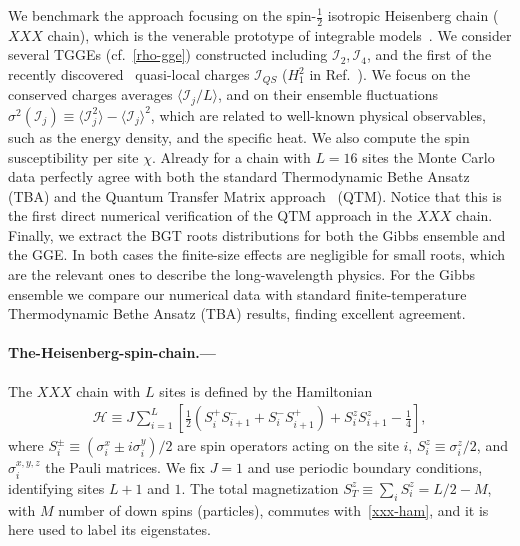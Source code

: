 \documentclass[twocolumn,superscriptaddress,prb,10pt]{revtex4-1}
\begin{document}
We benchmark the approach focusing on the spin-$\frac{1}{2}$ isotropic 
Heisenberg chain ($XXX$ chain), which is the venerable prototype of integrable 
models~\cite{bethe-1931}. We consider several TGGEs 
(cf.~\eqref{rho-gge}) constructed including ${\mathcal I}_2,{\mathcal I}_4$, and the 
first of the recently discovered~\cite{ilievski-2015,ilievski-2015a} 
quasi-local charges ${\mathcal I}_{QS}$ ($H_1^2$ in Ref.~). 
We focus on the conserved charges averages $\langle{\mathcal I}_j/L\rangle$, 
and on their ensemble fluctuations $\sigma^2({\mathcal I}_j)\equiv\langle{\mathcal I}_j^2
\rangle-\langle{\mathcal I}_j\rangle^2$, which  are related to well-known physical 
observables, such as the energy density, and the specific heat. We also compute the spin susceptibility 
per site $\chi$. Already for a chain with $L=16$ sites the Monte Carlo data perfectly agree 
with both the standard Thermodynamic Bethe Ansatz~\cite{mossel-2012} (TBA) and the Quantum Transfer 
Matrix approach~\cite{fagotti-2013a,pozsgay-2013} (QTM). Notice that this is the first direct 
numerical verification of the QTM approach in the $XXX$ chain. 
Finally, we extract the BGT roots distributions for both the Gibbs ensemble and the GGE. 
In both cases the finite-size effects are negligible for small roots, which are the 
relevant ones to describe the long-wavelength physics. For the Gibbs ensemble we compare 
our numerical data with standard finite-temperature Thermodynamic Bethe Ansatz (TBA) results, 
finding excellent agreement. 


\paragraph*{The-Heisenberg-spin-chain.---}

The $XXX$ chain with $L$ sites is defined by the Hamiltonian 
%
\begin{align}
\label{xxx-ham}
{\mathcal H}\equiv J\sum\limits_{i=1}^L\left[\frac{1}{2}(S_i^+S^-_{i+1} 
+S_i^{-}S_{i+1}^+)+S_i^zS_{i+1}^z-\frac{1}{4}\right],  
\end{align}
%
where $S^{\pm}_i\equiv (\sigma_i^x\pm i\sigma_i^y)/2$ are spin operators acting on the 
site $i$, $S_i^z\equiv\sigma_i^z/2$, and $\sigma^{x,y,z}_i$ the Pauli matrices. We fix 
$J=1$ and use periodic boundary conditions, identifying sites $L+1$ and $1$. The total 
magnetization $S_{T}^z\equiv\sum_iS_i^z=L/2-M$, with $M$ number of down spins (particles), 
commutes with~\eqref{xxx-ham}, and it is here used to label its eigenstates. 
\end{document}
